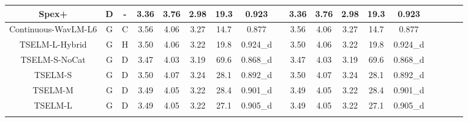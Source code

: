 \documentclass[conference]{IEEEtran}
\begin{document}
\begin{table}
\begin{center}
\begin{tabular}{cccccccccccccccccc}
  Spex+                   & D                                             & -                                                                                  & 3.36        & 3.76       & 2.98       & 19.3            & 0.923     &          & 3.36        & 3.76       & 2.98       & 19.3            & 0.923             \\ \hline
  Continuous-WavLM-L6     & G                                             & C                                                                                  & 3.56        & 4.06       & 3.27       & 14.7            & 0.877     &          & 3.56        & 4.06       & 3.27       & 14.7            & 0.877             \\
  TSELM-L-Hybrid          & G                                             & H                                                                                     & 3.50        & 4.06       & 3.22       & 19.8            & 0.924\_d  &          & 3.50        & 4.06       & 3.22       & 19.8            & 0.924\_d             \\
  TSELM-S-NoCat       & G                                             & D                                                                                   & 3.47        & 4.03       & 3.19       & 69.6            & 0.868\_d    &        & 3.47        & 4.03       & 3.19       & 69.6            & 0.868\_d         \\ \hline
  TSELM-S                 & G                                             & D                                                                                    & 3.50        & 4.07       & 3.24       & 28.1            & 0.892\_d      &      & 3.50        & 4.07       & 3.24       & 28.1            & 0.892\_d            \\
  TSELM-M                 & G                                             & D                                                                                   & 3.49        & 4.05       & 3.22       & 28.4            & 0.901\_d    &        & 3.49        & 4.05       & 3.22       & 28.4            & 0.901\_d             \\
  TSELM-L                 & G                                             & D                                                                                  & 3.49        & 4.05       & 3.22       & 27.1            & 0.905\_d    &        & 3.49        & 4.05       & 3.22       & 27.1            & 0.905\_d        \\
  \Xhline{2\arrayrulewidth} %
  \end{tabular}
\end{center}
  \end{table}
\end{document}
